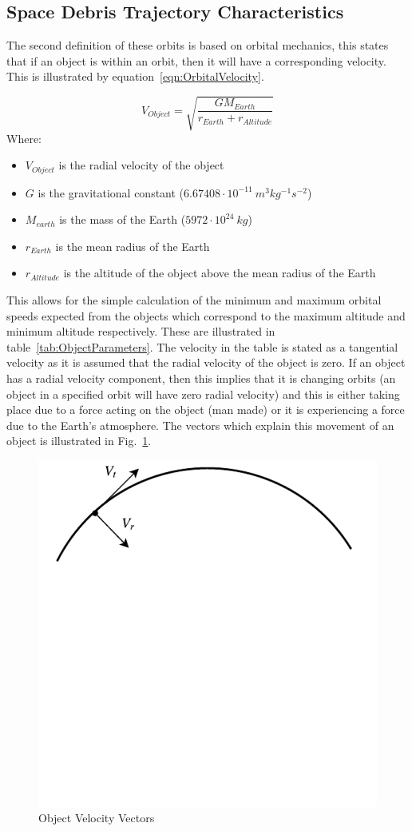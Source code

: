 \documentclass[11pt]{witseiepaper}
\begin{document}
\begin{bibunit}[witseie]
\subsection{Space Debris Trajectory Characteristics} \label{sec:SpaceDebrisTrajectoryCharacteristics}
The second definition of these orbits is based on orbital mechanics, this states that if an object is within an orbit, then it will have a corresponding velocity.
This is illustrated by equation~\ref{eqn:OrbitalVelocity}. 

\begin{equation} \label{eqn:OrbitalVelocity}
    V_{Object} = \sqrt{\frac{G M_{Earth}}{r_{Earth} + r_{Altitude}}}
\end{equation}
Where:
\begin{itemize}
    \item $V_{Object}$ is the radial velocity of the object
    \item $G$ is the gravitational constant ($6.67408 \cdot 10^{-11}~m^3 kg^{-1} s^{-2}$)
    \item $M_{earth}$ is the mass of the Earth ($5972 \cdot 10^{24}~kg$)
    \item $r_{Earth}$ is the mean radius of the Earth
    \item $r_{Altitude}$ is the altitude of the object above the mean radius of the Earth
\end{itemize}

This allows for the simple calculation of the minimum and maximum orbital speeds expected from the objects which correspond to the maximum altitude and minimum altitude respectively. These are illustrated in table~\ref{tab:ObjectParameters}. The velocity in the table is stated as a tangential velocity as it is assumed that the radial velocity of the object is zero. If an object has a radial velocity component, then this implies that it is changing orbits (an object in a specified orbit will have zero radial velocity) and this is either taking place due to a force acting on the object (man made) or it is experiencing a force due to the Earth's atmosphere. The vectors which explain this movement of an object is illustrated in Fig.~\ref{fig:ObjectVelocityVectors}.

\begin{figure}[htb]
\centering
\includegraphics[width=0.5\linewidth]{Vectors.pdf}
\caption{Object Velocity Vectors}
\label{fig:ObjectVelocityVectors}
\end{figure}


\end{bibunit}
\end{document}
